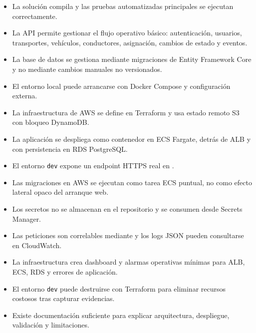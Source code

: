 \begin{itemize}
  \item La solución compila y las pruebas automatizadas principales se ejecutan correctamente.
  \item La API permite gestionar el flujo operativo básico: autenticación, usuarios, transportes, vehículos, conductores, asignación, cambios de estado y eventos.
  \item La base de datos se gestiona mediante migraciones de Entity Framework Core y no mediante cambios manuales no versionados.
  \item El entorno local puede arrancarse con Docker Compose y configuración externa.
  \item La infraestructura de AWS se define en Terraform y usa estado remoto S3 con bloqueo DynamoDB.
  \item La aplicación se despliega como contenedor en ECS Fargate, detrás de ALB y con persistencia en RDS PostgreSQL.
  \item El entorno \texttt{dev} expone un endpoint HTTPS real en .
  \item Las migraciones en AWS se ejecutan como tarea ECS puntual, no como efecto lateral opaco del arranque web.
  \item Los secretos no se almacenan en el repositorio y se consumen desde Secrets Manager.
  \item Las peticiones son correlables mediante  y los logs JSON pueden consultarse en CloudWatch.
  \item La infraestructura crea dashboard y alarmas operativas mínimas para ALB, ECS, RDS y errores de aplicación.
  \item El entorno \texttt{dev} puede destruirse con Terraform para eliminar recursos costosos tras capturar evidencias.
  \item Existe documentación suficiente para explicar arquitectura, despliegue, validación y limitaciones.
\end{itemize}
